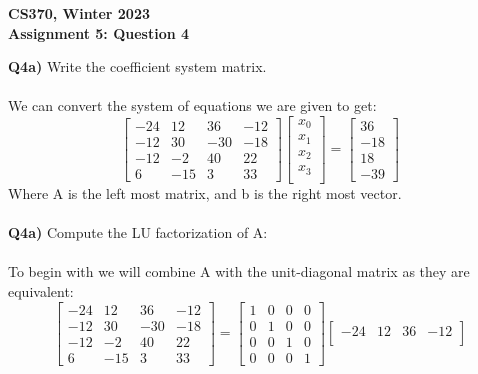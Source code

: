 \documentclass[12pt]{article}
\begin{document}
\begin{center}
{\Large\textbf{CS370, Winter 2023}}\\
\vspace{2mm}
{\Large\textbf{Assignment 5: Question 4}}\\
\vspace{3mm}
\end{center}

\begin{adjustwidth}{0em}{0pt}
\textbf{Q4a)} Write the coefficient system matrix. \\\\
We can convert the system of equations we are given to get:
\[ 
\begin{bmatrix}
-24 & 12 & 36 & -12\\
-12 & 30 & -30 & -18\\
-12 & -2 & 40 & 22\\
6 & -15 & 3 & 33
\end{bmatrix}
\begin{bmatrix}
x_0 \\
x_1 \\
x_2 \\
x_3 \\
\end{bmatrix}
=
\begin{bmatrix}
36 \\
-18 \\
18 \\
-39
\end{bmatrix}\]
Where A is the left most matrix, and b is the right most vector.\\\\
\textbf{Q4a)} Compute the LU factorization of A: \\\\
To begin with we will combine A with the unit-diagonal matrix as they are equivalent:
\[ 
\begin{bmatrix}
-24 & 12 & 36 & -12\\
-12 & 30 & -30 & -18\\
-12 & -2 & 40 & 22\\
6 & -15 & 3 & 33
\end{bmatrix}
=
\begin{bmatrix}
1 & 0 & 0 & 0\\
0 & 1 & 0 & 0\\
0 & 0 & 1 & 0\\
0 & 0 & 0 & 1
\end{bmatrix}
\begin{bmatrix}
-24 & 12 & 36 & -12\\

\end{bmatrix}\]
\end{adjustwidth}
\end{document}
